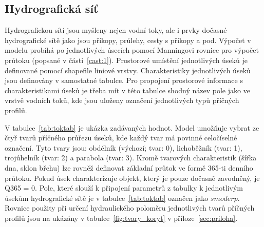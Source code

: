 \subsection{Hydrografická síť} \label{sec:vodnitoky}

Hydrografickou sítí jsou myšleny nejen vodní toky, ale i prvky dočasné hydrografické sítě jako jsou příkopy, průlehy, cesty s příkopy a pod. Výpočet v modelu probíhá po jednotlivých úsecích pomocí Manningovi rovnice pro výpočet průtoku (popsané v části~\ref{cast:1}). Prostorové umístění jednotlivých úseků je definované pomocí shapefile liniové vrstvy. Charakteristiky jednotlivých úseků jsou definovány v samostatné tabulce. Pro propojení prostorové informace s charakteristikami úseků je třeba mít v této tabulce shodný název pole jako ve vrstvě vodních toků, kde jsou uloženy označení jednotlivých typů příčných profilů.

V tabulce~\ref{tab:toktab} je ukázka zadávaných hodnot.  Model umožňuje vybrat ze čtyř tvarů příčného průřezu úseků, kde každý tvar má povinné celočíselné označení. Tyto tvary jsou: obdélník (výchozí; tvar: 0), lichoběžník (tvar: 1), trojúhelník (tvar: 2) a parabola (tvar: 3). Kromě tvarových charakteristik (šířka dna, sklon břehu) lze rovněž definovat základní průtok ve formě 365-ti denního průtoku. Pokud úsek charakterizuje objekt, který je pouze dočasně zavodněný, je Q365 = 0. Pole, které slouží k připojení parametrů z tabulky k jednotlivým úsekům hydrografické sítě je v tabulce~\ref{tab:toktab} označen jako $smoderp$. Rovnice použity při určení hydraulického poloměru jednotlivých tvarů příčných profilů jsou na ukázány v tabulce~\ref{fig:tvary_koryt} v příloze~\ref{sec:priloha}.
% 

